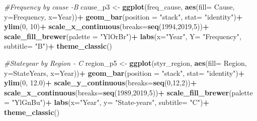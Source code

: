 \documentclass[
]{article}
\newenvironment{Shaded}{\begin{snugshade}}{\end{snugshade}}
\newcommand{\CommentTok}[1]{\textcolor[rgb]{0.56,0.35,0.01}{\textit{#1}}}
\newcommand{\DataTypeTok}[1]{\textcolor[rgb]{0.13,0.29,0.53}{#1}}
\newcommand{\DecValTok}[1]{\textcolor[rgb]{0.00,0.00,0.81}{#1}}
\newcommand{\FloatTok}[1]{\textcolor[rgb]{0.00,0.00,0.81}{#1}}
\newcommand{\KeywordTok}[1]{\textcolor[rgb]{0.13,0.29,0.53}{\textbf{#1}}}
\newcommand{\NormalTok}[1]{#1}
\newcommand{\OperatorTok}[1]{\textcolor[rgb]{0.81,0.36,0.00}{\textbf{#1}}}
\newcommand{\StringTok}[1]{\textcolor[rgb]{0.31,0.60,0.02}{#1}}
\begin{document}
\begin{Shaded}
\begin{Highlighting}[]
\CommentTok{#Frequency by cause -B}
\NormalTok{cause_p3 <-}\StringTok{ }\KeywordTok{ggplot}\NormalTok{(freq_cause, }\KeywordTok{aes}\NormalTok{(}\DataTypeTok{fill=}\NormalTok{ Cause, }\DataTypeTok{y=}\NormalTok{Frequency, }\DataTypeTok{x=}\NormalTok{Year))}\OperatorTok{+}
\StringTok{  }\KeywordTok{geom_bar}\NormalTok{(}\DataTypeTok{position =} \StringTok{"stack"}\NormalTok{, }\DataTypeTok{stat=} \StringTok{"identity"}\NormalTok{)}\OperatorTok{+}
\StringTok{  }\KeywordTok{ylim}\NormalTok{(}\DecValTok{0}\NormalTok{, }\DecValTok{10}\NormalTok{)}\OperatorTok{+}
\StringTok{  }\KeywordTok{scale_x_continuous}\NormalTok{(}\DataTypeTok{breaks=}\KeywordTok{seq}\NormalTok{(}\DecValTok{1994}\NormalTok{,}\DecValTok{2019}\NormalTok{,}\DecValTok{5}\NormalTok{))}\OperatorTok{+}
\StringTok{  }\KeywordTok{scale_fill_brewer}\NormalTok{(}\DataTypeTok{palette =} \StringTok{"YlOrBr"}\NormalTok{)}\OperatorTok{+}
\StringTok{  }\KeywordTok{labs}\NormalTok{(}\DataTypeTok{x=}\StringTok{"Year"}\NormalTok{, }\DataTypeTok{Y=} \StringTok{"Frequency"}\NormalTok{, }\DataTypeTok{subtitle=} \StringTok{"B"}\NormalTok{)}\OperatorTok{+}
\StringTok{  }\KeywordTok{theme_classic}\NormalTok{()}


\CommentTok{#Stateyear by Region - C}
\NormalTok{region_p5 <-}\StringTok{ }\KeywordTok{ggplot}\NormalTok{(styr_region, }\KeywordTok{aes}\NormalTok{(}\DataTypeTok{fill=}\NormalTok{ Region, }\DataTypeTok{y=}\NormalTok{StateYears, }\DataTypeTok{x=}\NormalTok{Year))}\OperatorTok{+}
\StringTok{  }\KeywordTok{geom_bar}\NormalTok{(}\DataTypeTok{position =} \StringTok{"stack"}\NormalTok{, }\DataTypeTok{stat=} \StringTok{"identity"}\NormalTok{)}\OperatorTok{+}
\StringTok{  }\KeywordTok{ylim}\NormalTok{(}\DecValTok{0}\NormalTok{, }\FloatTok{12.0}\NormalTok{)}\OperatorTok{+}
\StringTok{  }\KeywordTok{scale_y_continuous}\NormalTok{(}\DataTypeTok{breaks=}\KeywordTok{seq}\NormalTok{(}\DecValTok{0}\NormalTok{,}\DecValTok{12}\NormalTok{,}\DecValTok{2}\NormalTok{))}\OperatorTok{+}
\StringTok{  }\KeywordTok{scale_x_continuous}\NormalTok{(}\DataTypeTok{breaks=}\KeywordTok{seq}\NormalTok{(}\DecValTok{1989}\NormalTok{,}\DecValTok{2019}\NormalTok{,}\DecValTok{5}\NormalTok{))}\OperatorTok{+}
\StringTok{  }\KeywordTok{scale_fill_brewer}\NormalTok{(}\DataTypeTok{palette =} \StringTok{"YlGnBu"}\NormalTok{)}\OperatorTok{+}
\StringTok{  }\KeywordTok{labs}\NormalTok{(}\DataTypeTok{x=}\StringTok{"Year"}\NormalTok{, }\DataTypeTok{y=} \StringTok{"State-years"}\NormalTok{, }\DataTypeTok{subtitle=} \StringTok{"C"}\NormalTok{)}\OperatorTok{+}
\StringTok{  }\KeywordTok{theme_classic}\NormalTok{()}
\end{Highlighting}
\end{Shaded}
\end{document}
